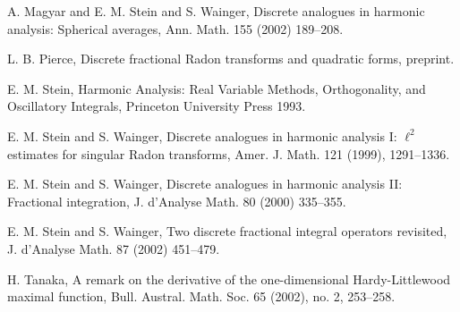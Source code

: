 \documentclass[reqno]{amsart}
\theoremstyle{definition}
\theoremstyle{remark}
\numberwithin{equation}{section}
\begin{document}
\begin{thebibliography}{99}
   	A. Magyar and E. M. Stein and S. Wainger,
  \newblock Discrete analogues in harmonic analysis: {S}pherical averages,
   \newblock Ann. Math. 155 (2002) 189--208.
   
L. B. Pierce, 
\newblock Discrete fractional Radon transforms and quadratic forms,
\newblock preprint.

E. M. Stein, 
\newblock Harmonic Analysis: Real Variable Methods, Orthogonality, and Oscillatory Integrals, \newblock Princeton University Press 1993.

E. M. Stein and S. Wainger,
\newblock Discrete analogues in harmonic analysis {I}: $\ell^2$ estimates for singular {R}adon transforms,
\newblock Amer. J. Math. 121 (1999), 1291--1336.

E. M. Stein and S. Wainger,
\newblock Discrete analogues in harmonic analysis {II}: Fractional integration,
\newblock J. d'Analyse Math. 80 (2000) 335--355.

E. M. Stein and S. Wainger,
 \newblock Two discrete fractional integral operators revisited,
\newblock J. d'Analyse Math. 87 (2002) 451--479.



H. Tanaka, 
\newblock A remark on the derivative of the one-dimensional Hardy-Littlewood maximal function,
\newblock Bull. Austral. Math. Soc. 65 (2002), no. 2, 253--258.

\end{thebibliography}
\end{document}

